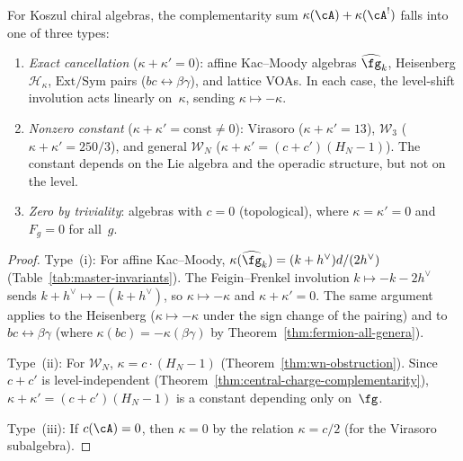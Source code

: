 \begin{proposition}\label{prop:complementarity-classification}
For Koszul chiral algebras, the complementarity sum
$\kappa(\cA) + \kappa(\cA^!)$ falls into one of three types:
\begin{enumerate}[label=\textup{(\roman*)}]
\item \emph{Exact cancellation}
($\kappa + \kappa' = 0$):
affine Kac--Moody algebras $\widehat{\fg}_k$,
Heisenberg $\mathcal{H}_\kappa$,
$\mathrm{Ext}/\mathrm{Sym}$ pairs
($bc \leftrightarrow \beta\gamma$),
and lattice VOAs.  In each case, the level-shift involution
acts linearly on~$\kappa$, sending
$\kappa \mapsto -\kappa$.
\item \emph{Nonzero constant}
($\kappa + \kappa' = \text{const} \neq 0$):
Virasoro ($\kappa + \kappa' = 13$),
$\mathcal{W}_3$ ($\kappa + \kappa' = 250/3$),
and general $\mathcal{W}_N$
($\kappa + \kappa' = (c+c')(H_N - 1)$).
The constant depends on the Lie algebra and the
operadic structure, but not on the level.
\item \emph{Zero by triviality}:
algebras with $c = 0$ (topological), where
$\kappa = \kappa' = 0$ and $F_g = 0$ for all~$g$.
\end{enumerate}
\end{proposition}

\begin{proof}
Type~(i):  For affine Kac--Moody, $\kappa(\widehat{\fg}_k)
= (k + h^\vee) d / (2h^\vee)$
(Table~\ref{tab:master-invariants}).  The Feigin--Frenkel
involution $k \mapsto -k - 2h^\vee$ sends
$k + h^\vee \mapsto -(k + h^\vee)$, so
$\kappa \mapsto -\kappa$ and $\kappa + \kappa' = 0$.
The same argument applies to the Heisenberg ($\kappa \mapsto
-\kappa$ under the sign change of the pairing) and to
$bc \leftrightarrow \beta\gamma$ (where
$\kappa(bc) = -\kappa(\beta\gamma)$ by
Theorem~\ref{thm:fermion-all-genera}).

Type~(ii): For $\mathcal{W}_N$,
$\kappa = c \cdot (H_N - 1)$
(Theorem~\ref{thm:wn-obstruction}).
Since $c + c'$ is level-independent
(Theorem~\ref{thm:central-charge-complementarity}),
$\kappa + \kappa' = (c + c')(H_N - 1)$ is a constant
depending only on~$\fg$.

Type~(iii): If $c(\cA) = 0$, then $\kappa = 0$ by the
relation $\kappa = c/2$ (for the Virasoro subalgebra).
\end{proof}

